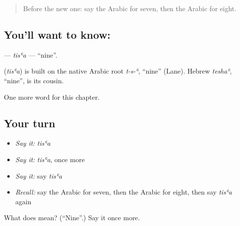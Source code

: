 \begin{quote}
Before the new one: say the Arabic for seven, then the Arabic for eight.
\end{quote}

\subsection*{You'll want to know: }
\textbf{} — \emph{tisʿa} — \textquotedblleft{}nine\textquotedblright{}.

\begin{cousinweb}
\textbf{} (\emph{tisʿa}) is built on the native Arabic root \emph{t-s-ʿ}, \textquotedblleft{}nine\textquotedblright{} (Lane). Hebrew \emph{teshaʿ}, \textquotedblleft{}nine\textquotedblright{}, is its cousin.
\end{cousinweb}

\begin{grammarlens}[title={What you've built}]
One more word for this chapter.
\end{grammarlens}

\subsection*{Your turn}
\begin{itemize}
\raggedright
  \item \emph{Say it:} \emph{tisʿa}
  \item \emph{Say it:} \emph{tisʿa}, once more
  \item \emph{Say it:} say \emph{tisʿa}
  \item \emph{Recall:} say the Arabic for seven, then the Arabic for eight, then say \emph{tisʿa} again
\end{itemize}

\begin{tcolorbox}[breakable,colback=teal!4,colframe=teal!35!black,title={Before you move on}]
What does  mean? (\textquotedblleft{}Nine\textquotedblright{}.) Say it once more.
\end{tcolorbox}
